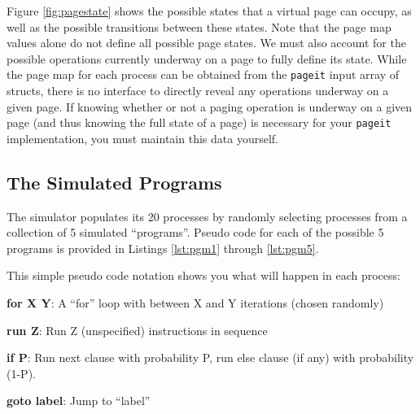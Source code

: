 \documentclass[12pt]{article}
\newenvironment{packed_item}{
\begin{itemize}
  \setlength{\itemsep}{1pt}
  \setlength{\parskip}{0pt}
  \setlength{\parsep}{0pt}
}{\end{itemize}}
\begin{document}
Figure \ref{fig:pagestate} shows the possible states that a virtual
page can occupy, as well as the possible transitions between these
states. Note that the page map values alone do not define all possible
page states. We must also account for the possible operations
currently underway on a page to fully define its state. While the page
map for each process can be obtained from the \texttt{pageit} input
array of structs, there is no interface to directly reveal any
operations underway on a given page. If knowing whether or not a
paging operation is underway on a given page (and thus knowing the full
state of a page) is necessary for your \texttt{pageit} implementation, you
must maintain this data yourself.

\subsection {The Simulated Programs}

The simulator populates its 20 processes by randomly selecting processes
from a collection of 5 simulated ``programs''. Pseudo code for each of
the possible 5 programs is provided in Listings \ref{lst:pgm1} through
\ref{lst:pgm5}.











This simple pseudo code notation shows you what will happen in each
process:
\begin{packed_item}
\item {\bf for X Y}: A ``for'' loop with between X and Y iterations
  (chosen randomly)
\item {\bf run Z}: Run Z (unspecified) instructions in sequence
\item {\bf if P}: Run next clause with probability P,
  run else clause (if any) with probability (1-P).
\item {\bf goto label}: Jump to ``label''
\end{packed_item}
\end{document}
